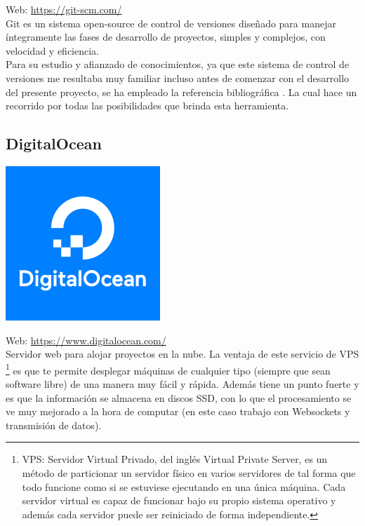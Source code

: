 Web: \url{https://git-scm.com/}\\

Git es un sistema open-source de control de versiones diseñado para manejar íntegramente las fases de desarrollo de proyectos, simples y complejos, con velocidad y eficiencia.\\

Para su estudio y afianzado de conocimientos, ya que este sistema de control de versiones me resultaba muy familiar incluso antes de comenzar con el desarrollo del presente proyecto, se ha empleado 
la referencia bibliográfica \cite{book:git}. La cual hace un recorrido por todas las posibilidades que brinda esta herramienta.\\


\subsection{DigitalOcean}

\begin{center}\includegraphics[scale=0.35]{imagenes/docean-logo.png}\end{center}

Web: \url{https://www.digitalocean.com/} \cite{website:5}\\

Servidor web para alojar proyectos en la nube. La ventaja de este servicio de VPS \footnote{ VPS: Servidor Virtual Privado, del inglés Virtual Private Server, es un método de particionar un servidor
físico en varios servidores de tal forma que todo funcione como si se estuviese ejecutando en una única máquina. Cada servidor virtual es capaz de funcionar bajo su propio sistema operativo y
además cada servidor puede ser reiniciado de forma independiente.} es que te permite desplegar máquinas de cualquier tipo (siempre que sean software libre) de una manera muy fácil y rápida. 
Además tiene un punto fuerte y es que la información se almacena en discos SSD, con lo que el procesamiento se ve muy mejorado a la hora de computar (en este caso trabajo con Websockets y 
transmisión de datos).\\

